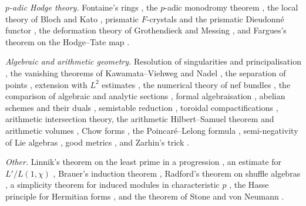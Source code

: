 \emph{$p$-adic Hodge theory.} Fontaine's rings
\cite{fontaine1982certains,fontaine1994corps,fontaine1994semistables}, the $p$-adic monodromy
theorem \cite{berger2002representations,andre2002filtrations,mebkhout2002analogue,kedlaya2004padic}, the local
theory of Bloch and Kato \cite{bloch1990lfunctions}, prismatic $F$-crystals and the prismatic
Dieudonn\'e functor \cite{bhatt2023prismatic,anschutz2023prismatic}, the deformation theory of
Grothendieck and Messing \cite{messing1972crystals,mazur1974universal}, and Fargues's theorem on
the Hodge--Tate map \cite{fargues2008isomorphisme,tate1967pdivisible}.

\emph{Algebraic and arithmetic geometry.} Resolution of singularities and principalisation
\cite{hironaka1964resolution,kollar2007lectures}, the vanishing theorems of Kawamata--Viehweg
and Nadel \cite{kawamata1982generalization,viehweg1982vanishing,nadel1990multiplier}, the
separation of points \cite{angehrn1995effective}, extension with $L^2$ estimates
\cite{ohsawa1987extension,demailly2016extension}, the numerical theory of nef bundles
\cite{kleiman1966toward,lazarsfeld2004positivity}, the comparison of algebraic and analytic
sections \cite{serre1956geometrie}, formal algebraisation \cite{grothendieck1961elements},
abelian schemes and their duals \cite{mumford1965geometric,mumford1970abelian}, semistable
reduction \cite{grothendieck1972groupes}, toroidal compactifications
\cite{ash1975smooth,faltings1990degeneration,lan2013arithmetic,pink1989arithmetical},
arithmetic intersection theory, the arithmetic Hilbert--Samuel theorem and arithmetic volumes
\cite{gillet1990arithmetic,gillet1992arithmetic,bost1994heights,abbes1995theoreme,zhang1995positive,moriwaki2009continuity},
Chow forms \cite{chow1937algebraischen}, the Poincar\'e--Lelong formula
\cite{lelong1957integration}, semi-negativity of Lie algebras \cite{bost2004germs}, good
metrics \cite{mumford1977hirzebruch}, and Zarhin's trick \cite{zarhin1977endomorphisms}.

\emph{Other.} Linnik's theorem on the least prime in a progression
\cite{linnik1944least1,linnik1944least2}, an estimate for $L'/L(1,\chi)$
\cite{davenport1980multiplicative}, Brauer's induction theorem \cite{brauer1947artin},
Radford's theorem on shuffle algebras \cite{radford1979natural}, a simplicity theorem for
induced modules in characteristic $p$ \cite{andersen1980strong,jantzen2003representations},
the Hasse principle for Hermitian forms \cite{landherr1936aquivalenz,jacobowitz1962hermitian},
and the theorem of Stone and von Neumann \cite{stone1930linear,vonneumann1931eindeutigkeit}.


